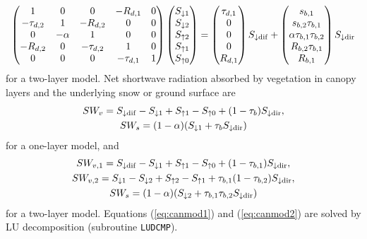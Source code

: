 \documentclass[fleqn]{article}
\begin{document}
\begin{equation}
\begin{pmatrix}
1           & 0       & 0           & -R_{d,1}    & 0 \\
-\tau_{d,2} & 1       & -R_{d,2}    & 0           & 0 \\
0           & -\alpha & 1           & 0           & 0 \\
-R_{d,2}    & 0       & -\tau_{d,2} & 1           & 0 \\
0           & 0       & 0           & -\tau_{d,1} & 1 \\
\end{pmatrix}
\begin{pmatrix}
S_{\downarrow 1} \\
S_{\downarrow 2} \\
S_{\uparrow 2}   \\
S_{\uparrow 1}   \\
S_{\uparrow 0}   \\
\end{pmatrix}
=
\begin{pmatrix}
\tau_{d,1} \\
0          \\
0          \\
0          \\
R_{d,1}    \\
\end{pmatrix}
S_{\downarrow\rm dif} +
\begin{pmatrix}
s_{b,1}                    \\
s_{b,2}\tau_{b,1}          \\
\alpha\tau_{b,1}\tau_{b,2} \\
R_{b,2}\tau_{b,1}          \\
R_{b,1}                    \\
\end{pmatrix}
S_{\downarrow\rm dir}
\label{eq:canmod2}
\end{equation}
for a two-layer model. Net shortwave radiation absorbed by vegetation in canopy layers and the underlying snow or ground surface are
\begin{gather}
SW_v = S_{\downarrow\rm dif} - S_{\downarrow 1} + S_{\uparrow 1} - S_{\uparrow 0}
         + (1 - \tau_b)S_{\downarrow\rm dir}, \\
SW_s = (1-\alpha)(S_{\downarrow 1} + \tau_b S_{\downarrow\rm dir})
\end{gather}
for a one-layer model, and
\begin{gather}
SW_{v,1} = S_{\downarrow\rm dif} - S_{\downarrow 1} + S_{\uparrow 1} - S_{\uparrow 0} +
          (1 - \tau_{b,1})S_{\downarrow\rm dir}, \\
SW_{v,2} = S_{\downarrow 1} - S_{\downarrow 2} + S_{\uparrow 2} - S_{\uparrow 1} +
          \tau_{b,1}(1 - \tau_{b,2})S_{\downarrow\rm dir}, \\
SW_s = (1-\alpha)(S_{\downarrow 2} + \tau_{b,1}\tau_{b,2}S_{\downarrow\rm dir})
\end{gather}
for a two-layer model. Equations (\ref{eq:canmod1}) and (\ref{eq:canmod2}) are solved by LU decomposition (subroutine {\tt LUDCMP}).
\end{document}

